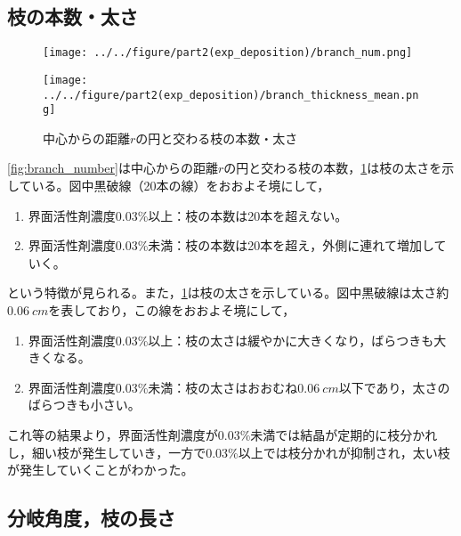 \documentclass[autodetect-engine,dvi=dvipdfmx,a4paper,ja=standard,oneside,openany,11pt,draft]{bxjsbook}
\begin{document}
\subsection{枝の本数・太さ}
\begin{figure}[H]
  \begin{minipage}
    {0.5\textwidth}
    \centering
    \texttt{[image: ../../figure/part2(exp\_deposition)/branch\_num.png]}
    \label{fig:branch_number}
  \end{minipage}
  \begin{minipage}
    {0.5\textwidth}
    \centering
    \texttt{[image: ../../figure/part2(exp\_deposition)/branch\_thickness\_mean.png]}
    \label{fig:branch_thickness}
  \end{minipage}
  \caption{中心からの距離$r$の円と交わる枝の本数・太さ}
\end{figure}
\ref{fig:branch_number}は中心からの距離$r$の円と交わる枝の本数，\ref{fig:branch_thickness}は枝の太さを示している。図中黒破線（20本の線）をおおよそ境にして，
\begin{enumerate}
  \item 界面活性剤濃度0.03\%以上：枝の本数は20本を超えない。
  \item 界面活性剤濃度0.03\%未満：枝の本数は20本を超え，外側に連れて増加していく。
\end{enumerate}
という特徴が見られる。また，\ref{fig:branch_thickness}は枝の太さを示している。図中黒破線は太さ約$\SI{0.06}{cm}$を表しており，この線をおおよそ境にして，
\begin{enumerate}
  \item 界面活性剤濃度0.03\%以上：枝の太さは緩やかに大きくなり，ばらつきも大きくなる。
  \item 界面活性剤濃度0.03\%未満：枝の太さはおおむね$\SI{0.06}{cm}$以下であり，太さのばらつきも小さい。
\end{enumerate}
これ等の結果より，界面活性剤濃度が0.03\%未満では結晶が定期的に枝分かれし，細い枝が発生していき，一方で0.03\%以上では枝分かれが抑制され，太い枝が発生していくことがわかった。
\subsection{分岐角度，枝の長さ}
\end{document}
